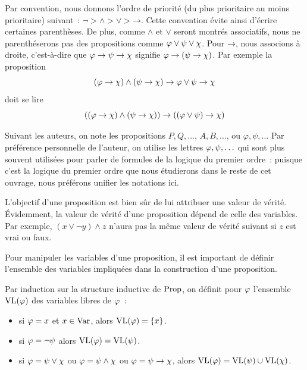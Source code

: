 Par convention, nous donnons l'ordre de priorité (du plus prioritaire au moins
prioritaire) suivant~:
$\mathord{\lnot} > \mathord{\land} > \mathord{\lor} > \mathord{\to}$.
Cette convention évite ainsi d'écrire certaines parenthèses. De plus, comme
$\mathord{\land}$ et $\mathord{\lor}$ seront montrés associatifs, nous ne
parenthéserons pas des propositions comme $\varphi\lor \psi\lor \chi$.
Pour $\mathord{\to}$, nous associons à droite, c'est-à-dire que
$\varphi\to \psi\to \chi$ signifie $\varphi\to (\psi \to \chi)$. Par
exemple la proposition
\[(\varphi \to \chi)\land (\psi \to \chi) \to \varphi\lor
\psi \to \chi\]
doit se lire
\[((\varphi \to \chi) \land (\psi \to \chi))
\to ((\varphi \lor \psi) \to \chi)\]

\begin{remark}
  Suivant les auteurs, on note les propositions $P,Q,\ldots$, $A,B,\ldots$, ou
  $\varphi,\psi,\ldots$ Par préférence personnelle de l'auteur, on utilise les
  lettres $\varphi,\psi,\ldots$ qui sont plus souvent utilisées pour parler de
  formules de la logique du premier ordre~: puisque c'est la logique du premier
  ordre que nous étudierons dans le reste de cet ouvrage, nous préférons
  unifier les notations ici.
\end{remark}

L'objectif d'une proposition est bien sûr de lui attribuer une valeur de vérité.
\'Evidemment, la valeur de vérité d'une proposition dépend de celle des
variables.
Par exemple, $(x\lor \lnot y) \land z$ n'aura pas la même valeur de vérité
suivant si $z$ est vrai ou faux.

Pour manipuler les variables d'une proposition, il est important de définir
l'ensemble des variables impliquées dans la construction d'une proposition.

\begin{definition}
  Par induction sur la structure inductive de $\operatorname{Prop}$, on définit pour
  $\varphi$ l'ensemble $\operatorname{VL}(\varphi)$ des variables libres de $\varphi$~:
  \begin{itemize}
  \item si $\varphi = x$ et $x\in\operatorname{Var}$, alors $\operatorname{VL}(\varphi) = \{x\}$.
  \item si $\varphi = \lnot \psi$ alors $\operatorname{VL}(\varphi) = \operatorname{VL}(\psi)$.
  \item si $\varphi = \psi \lor \chi$ ou $\varphi = \psi \land \chi$ ou
    $\varphi = \psi \to \chi$,
    alors $\operatorname{VL}(\varphi) = \operatorname{VL}(\psi)\cup\operatorname{VL}(\chi)$.
  \end{itemize}
\end{definition}

